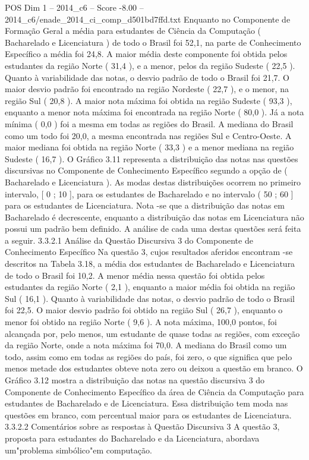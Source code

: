 \begin{textsample}{POS Dim 1 – 2014\_c6 – Score -8.00 – 2014\_c6/enade\_2014\_ci\_comp\_d501bd7ffd.txt}
Enquanto no Componente de Formação Geral a média para estudantes de Ciência da Computação ( Bacharelado e Licenciatura ) de todo o Brasil foi 52,1, na parte de Conhecimento Específico a média foi 24,8.
A maior média deste componente foi obtida pelos estudantes da região Norte ( 31,4 ), e a menor, pelos da região Sudeste ( 22,5 ).
Quanto à variabilidade das notas, o desvio padrão de todo o Brasil foi 21,7.
O maior desvio padrão foi encontrado na região Nordeste ( 22,7 ), e o menor, na região Sul ( 20,8 ).
A maior nota máxima foi obtida na região Sudeste ( 93,3 ), enquanto a menor nota máxima foi encontrada na região Norte ( 80,0 ).
Já a nota mínima ( 0,0 ) foi a mesma em todas as regiões do Brasil.
A mediana do Brasil como um todo foi 20,0, a mesma encontrada nas regiões Sul e Centro-Oeste.
A maior mediana foi obtida na região Norte ( 33,3 ) e a menor mediana na região Sudeste ( 16,7 ).
O Gráfico 3.11 representa a distribuição das notas nas questões discursivas no Componente de Conhecimento Específico segundo a opção de ( Bacharelado e Licenciatura ).
As modas destas distribuições ocorrem no primeiro intervalo, [ 0 ; 10 ], para os estudantes de Bacharelado e no intervalo ( 50 ; 60 ] para os estudantes de Licenciatura.
Nota -se que a distribuição das notas em Bacharelado é decrescente, enquanto a distribuição das notas em Licenciatura não possui um padrão bem definido.
A análise de cada uma destas questões será feita a seguir. 3.3.2.1 Análise da Questão Discursiva 3 do Componente de Conhecimento Específico Na questão 3, cujos resultados aferidos encontram -se descritos na Tabela 3.18, a média dos estudantes de Bacharelado e Licenciatura de todo o Brasil foi 10,2.
A menor média nessa questão foi obtida pelos estudantes da região Norte ( 2,1 ), enquanto a maior média foi obtida na região Sul ( 16,1 ).
Quanto à variabilidade das notas, o desvio padrão de todo o Brasil foi 22,5.
O maior desvio padrão foi obtido na região Sul ( 26,7 ), enquanto o menor foi obtido na região Norte ( 9,6 ).
A nota máxima, 100,0 pontos, foi alcançada por, pelo menos, um estudante de quase todas as regiões, com exceção da região Norte, onde a nota máxima foi 70,0.
A mediana do Brasil como um todo, assim como em todas as regiões do país, foi zero, o que significa que pelo menos metade dos estudantes obteve nota zero ou deixou a questão em branco.
O Gráfico 3.12 mostra a distribuição das notas na questão discursiva 3 do Componente de Conhecimento Específico da área de Ciência da Computação para estudantes de Bacharelado e de Licenciatura.
Essa distribuição tem moda nas questões em branco, com percentual maior para os estudantes de Licenciatura. 3.3.2.2 Comentários sobre as respostas à Questão Discursiva 3 A questão 3, proposta para estudantes do Bacharelado e da Licenciatura, abordava um"problema simbólico"em computação.

\end{textsample}
